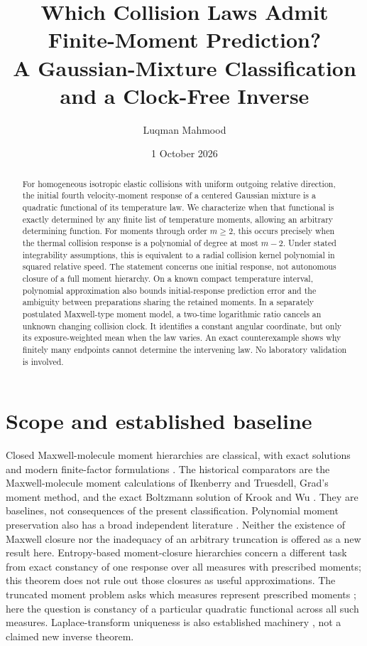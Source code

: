 \documentclass[11pt]{article}
\title{Which Collision Laws Admit Finite-Moment Prediction?\\
A Gaussian-Mixture Classification and a Clock-Free Inverse}
\author{Luqman Mahmood}
\date{1 October 2026}
\begin{document}
\maketitle
{}
\begin{abstract}
For homogeneous isotropic elastic collisions with uniform outgoing relative
direction, the initial fourth velocity-moment response of a centered
Gaussian mixture is a quadratic functional of its temperature law.
We characterize when that functional is exactly determined by any finite
list of temperature moments, allowing an arbitrary determining function.
For moments through order $m\geq2$, this occurs precisely when the thermal
collision response is a polynomial of degree at most $m-2$. Under stated
integrability assumptions, this is equivalent to a radial collision kernel
polynomial in squared relative speed. The statement concerns one initial
response, not autonomous closure of a full moment hierarchy.
On a known compact temperature interval, polynomial approximation also
bounds initial-response prediction error and the ambiguity between
preparations sharing the retained moments.
In a separately postulated Maxwell-type moment model, a two-time logarithmic ratio cancels an
unknown changing collision clock. It identifies a constant angular
coordinate, but only its exposure-weighted mean when the law varies.
An exact counterexample shows why finitely many endpoints cannot determine
the intervening law. No laboratory validation is involved.
\end{abstract}

\section{Scope and established baseline}
Closed Maxwell-molecule moment hierarchies are classical, with exact
solutions and modern finite-factor formulations \cite{Santos,Karlin}.
The historical comparators are the Maxwell-molecule moment calculations
of Ikenberry and Truesdell, Grad's moment method, and the exact
Boltzmann solution of Krook and Wu \cite{IkenberryTruesdell,Grad,KrookWu}.
They are baselines, not consequences of the present classification.
Polynomial moment preservation also has a broad independent literature
\cite{CKT}. Neither the existence of Maxwell closure nor the inadequacy
of an arbitrary truncation is offered as a new result here.
Entropy-based moment-closure hierarchies \cite{Levermore} concern a
different task from exact constancy of one response over all measures
with prescribed moments; this theorem does not rule out those closures
as useful approximations.
The truncated moment problem asks which measures represent prescribed
moments \cite{CurtoFialkow}; here the question is constancy of a particular
quadratic functional across all such measures. Laplace-transform uniqueness
is also established machinery \cite{SSV}, not a claimed new inverse theorem.
\end{document}
